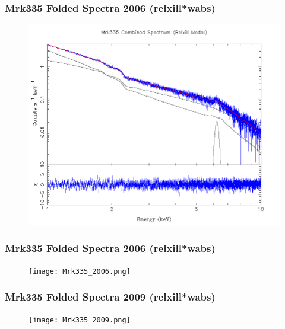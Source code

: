 \documentclass[]{beamer}
\begin{document}
\begin{frame}
\frametitle{Mrk335 Folded Spectra 2006 (relxill*wabs)}
\begin{figure}\centering
\includegraphics[scale=.40]{Mrk335_comb.png}
\end{figure}
\end{frame}


\begin{frame}
\frametitle{Mrk335 Folded Spectra 2006 (relxill*wabs)}
\begin{figure}\centering
\texttt{[image: Mrk335\_2006.png]}
\end{figure}
\end{frame}

\begin{frame}
\frametitle{Mrk335 Folded Spectra 2009 (relxill*wabs)}
\begin{figure}\centering
\texttt{[image: Mrk335\_2009.png]}
\end{figure}
\end{frame}
\end{document}

